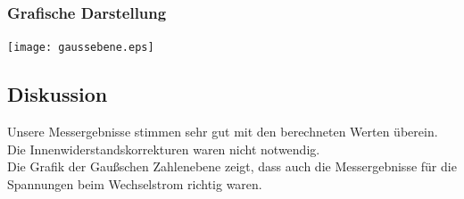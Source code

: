 \documentclass{article}
\begin{document}
\subsubsection*{Grafische Darstellung}
\texttt{[image: gaussebene.eps]}

\subsection{Diskussion}
Unsere Messergebnisse stimmen sehr gut mit den berechneten Werten überein.\\
Die Innenwiderstandskorrekturen waren nicht notwendig.\\
Die Grafik der Gaußschen Zahlenebene zeigt, dass auch die Messergebnisse für die Spannungen beim Wechselstrom richtig waren.\\
\end{document}
